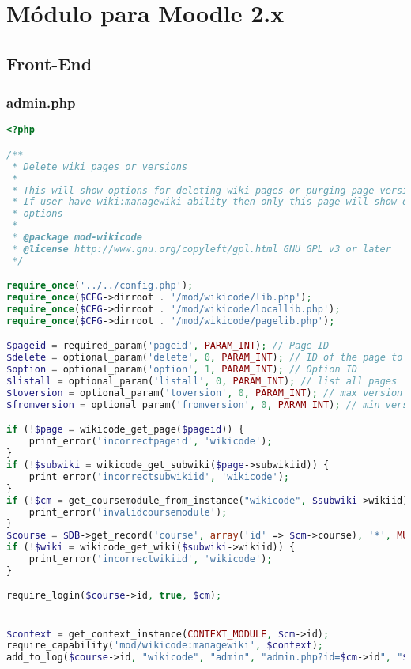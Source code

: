\chapter[Módulo para Moodle 2.x]{\label{}
Módulo para Moodle 2.x}

\section{Front-End}

\subsection{admin.php}
\begin{lstlisting}[language=PHP]
<?php

/**
 * Delete wiki pages or versions
 *
 * This will show options for deleting wiki pages or purging page versions
 * If user have wiki:managewiki ability then only this page will show delete
 * options
 *
 * @package mod-wikicode
 * @license http://www.gnu.org/copyleft/gpl.html GNU GPL v3 or later
 */

require_once('../../config.php');
require_once($CFG->dirroot . '/mod/wikicode/lib.php');
require_once($CFG->dirroot . '/mod/wikicode/locallib.php');
require_once($CFG->dirroot . '/mod/wikicode/pagelib.php');

$pageid = required_param('pageid', PARAM_INT); // Page ID
$delete = optional_param('delete', 0, PARAM_INT); // ID of the page to be deleted.
$option = optional_param('option', 1, PARAM_INT); // Option ID
$listall = optional_param('listall', 0, PARAM_INT); // list all pages
$toversion = optional_param('toversion', 0, PARAM_INT); // max version to be deleted
$fromversion = optional_param('fromversion', 0, PARAM_INT); // min version to be deleted

if (!$page = wikicode_get_page($pageid)) {
    print_error('incorrectpageid', 'wikicode');
}
if (!$subwiki = wikicode_get_subwiki($page->subwikiid)) {
    print_error('incorrectsubwikiid', 'wikicode');
}
if (!$cm = get_coursemodule_from_instance("wikicode", $subwiki->wikiid)) {
    print_error('invalidcoursemodule');
}
$course = $DB->get_record('course', array('id' => $cm->course), '*', MUST_EXIST);
if (!$wiki = wikicode_get_wiki($subwiki->wikiid)) {
    print_error('incorrectwikiid', 'wikicode');
}

require_login($course->id, true, $cm);


$context = get_context_instance(CONTEXT_MODULE, $cm->id);
require_capability('mod/wikicode:managewiki', $context);
add_to_log($course->id, "wikicode", "admin", "admin.php?id=$cm->id", "$wiki->id");


\end{lstlisting}
